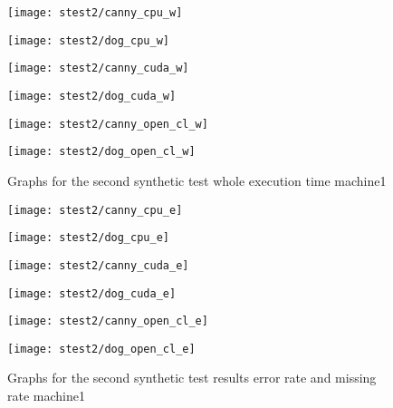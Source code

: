 \begin{figure}[H]
\centering
\begin{minipage}[t]{.49\textwidth}
\centering
\texttt{[image: stest2/canny\_cpu\_w]}
\end{minipage}
\begin{minipage}[t]{.49\textwidth}
\centering
\texttt{[image: stest2/dog\_cpu\_w]}
\end{minipage}
\begin{minipage}[t]{.49\textwidth}
\centering
\texttt{[image: stest2/canny\_cuda\_w]}
\end{minipage}
\begin{minipage}[t]{.49\textwidth}
\centering
\texttt{[image: stest2/dog\_cuda\_w]}
\end{minipage}
\begin{minipage}[t]{.49\textwidth}
\centering
\texttt{[image: stest2/canny\_open\_cl\_w]}
\end{minipage}
\begin{minipage}[t]{.49\textwidth}
\centering
\texttt{[image: stest2/dog\_open\_cl\_w]}
\end{minipage}
\caption{Graphs for the second synthetic test whole execution time machine1}
\label{fig:test2sw}
\end{figure}

\begin{figure}[H]
\centering
\begin{minipage}[t]{.49\textwidth}
\centering
\texttt{[image: stest2/canny\_cpu\_e]}
\end{minipage}
\begin{minipage}[t]{.49\textwidth}
\centering
\texttt{[image: stest2/dog\_cpu\_e]}
\end{minipage}
\begin{minipage}[t]{.49\textwidth}
\centering
\texttt{[image: stest2/canny\_cuda\_e]}
\end{minipage}
\begin{minipage}[t]{.49\textwidth}
\centering
\texttt{[image: stest2/dog\_cuda\_e]}
\end{minipage}
\begin{minipage}[t]{.49\textwidth}
\centering
\texttt{[image: stest2/canny\_open\_cl\_e]}
\end{minipage}
\begin{minipage}[t]{.49\textwidth}
\centering
\texttt{[image: stest2/dog\_open\_cl\_e]}
\end{minipage}
\caption{Graphs for the second synthetic test results error rate and missing rate machine1}
\label{fig:test2se}
\end{figure}

